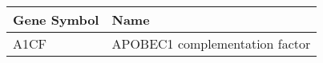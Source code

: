 \begin{tabular}{ll}
\toprule
Gene Symbol &                           Name \\
\midrule
       A1CF & APOBEC1 complementation factor \\
\bottomrule
\end{tabular}
